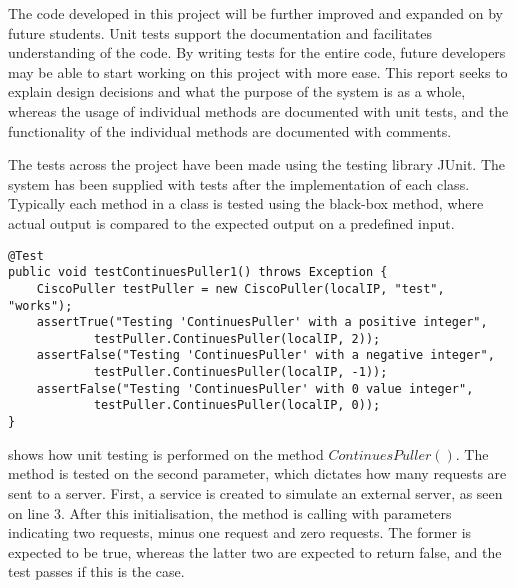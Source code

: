 The code developed in this project will be further improved and expanded on by future students. Unit tests support the documentation and facilitates understanding of the code.
By writing tests for the entire code, future developers may be able to start working on this project with more ease. 
This report seeks to explain design decisions and what the purpose of the system is as a whole, whereas the usage of individual methods are documented with unit tests, and the functionality of the individual methods are documented with comments.

The tests across the project have been made using the testing library JUnit\cite{junit4}. The system has been supplied with tests after the implementation of each class. Typically each method in a class is tested using the black-box method, where actual output is compared to the expected output on a predefined input.

\begin{lstlisting}[caption={Testing ContinuesPuller},label={lst:test_continuespuller},language=inc_Java, mathescape]
@Test
public void testContinuesPuller1() throws Exception {
    CiscoPuller testPuller = new CiscoPuller(localIP, "test", "works");
    assertTrue("Testing 'ContinuesPuller' with a positive integer",
            testPuller.ContinuesPuller(localIP, 2));
    assertFalse("Testing 'ContinuesPuller' with a negative integer",
            testPuller.ContinuesPuller(localIP, -1));
    assertFalse("Testing 'ContinuesPuller' with 0 value integer",
            testPuller.ContinuesPuller(localIP, 0));
}
\end{lstlisting}
 shows how unit testing is performed on the method $ContinuesPuller()$. The method is tested on the second parameter, which dictates how many requests are sent to a server. First, a service is created to simulate an external server, as seen on line 3. After this initialisation, the method is calling with parameters indicating two requests, minus one request and zero requests. The former is expected to be true, whereas the latter two are expected to return false, and the test passes if this is the case. 
